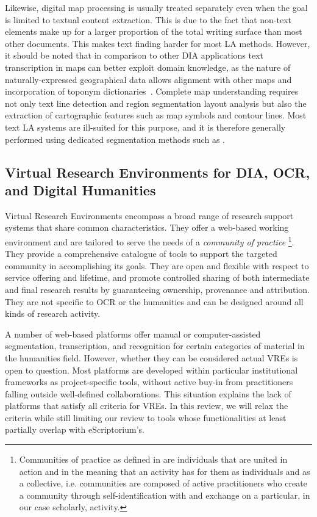 Likewise, digital map processing is usually treated separately even when the
goal is limited to textual content extraction. This is due to the fact that
non-text elements make up for a larger proportion of the total writing surface
than most other documents. This makes text finding harder for most LA methods.
However, it should be noted that in comparison to other DIA applications text
transcription in maps can better exploit domain knowledge, as the nature of
naturally-expressed geographical data allows alignment with other maps and
incorporation of toponym
dictionaries~\cite{weinman2013toponym,weinman17geographic,sun2020aligning}.
Complete map understanding requires not only text line detection and region
segmentation layout analysis but also the extraction of cartographic features
such as map symbols and contour lines. Most text LA systems are ill-suited for
this purpose, and it is therefore generally performed using dedicated
segmentation methods such as \cite{uhl2018spatialising,liu2020superpixel}.

\subsection{Virtual Research Environments for DIA, OCR, and Digital Humanities}

Virtual Research Environments encompass a broad range of research support
systems that share common characteristics. They offer a web-based working
environment and are tailored to serve the needs of a \emph{community of
practice} \footnote{Communities of practice as defined in
\cite{wenger1999communities} are individuals that are united in action and in
the meaning that an activity has for them as individuals and as a collective,
i.e. communities are composed of active practitioners who create a community
through self-identification with and exchange on a particular, in our case
scholarly, activity.}. They provide a comprehensive catalogue of tools to
support the targeted community in accomplishing its goals. They are open and
flexible with respect to service offering and lifetime, and promote controlled
sharing of both intermediate and final research results by guaranteeing
ownership, provenance and attribution\cite{candela2013virtual}. They are not
specific to OCR or the humanities and can be designed around all kinds of
research activity.

A number of web-based platforms offer manual or computer-assisted segmentation,
transcription, and recognition for certain categories of material in the
humanities field. However, whether they can be considered actual VREs is open
to question. Most platforms are developed within particular institutional
frameworks as project-specific tools, without active buy-in from practitioners
falling outside well-defined collaborations. This situation explains the lack
of platforms that satisfy all criteria for VREs. In this review, we will relax
the criteria while still limiting our review to tools whose functionalities at
least partially overlap with eScriptorium’s.

